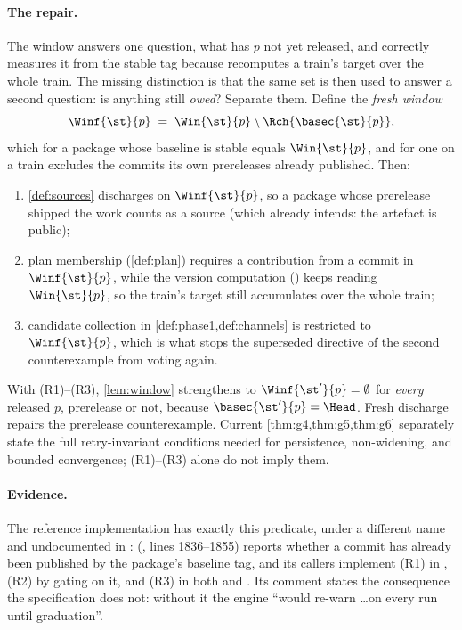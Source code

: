 \paragraph{The repair.} The window answers one question, what has $p$ not
yet released, and  correctly measures it from the stable tag
because  recomputes a train's target over the whole train. The
missing distinction is that the same set is then used to answer a second
question: is anything still \emph{owed}? Separate them. Define the
\emph{fresh window}
\[
  \Winf{\st}{p} \;=\; \Win{\st}{p} \setminus \Rch{\basec{\st}{p}},
\]
which for a package whose baseline is stable equals $\Win{\st}{p}$, and for one
on a train excludes the commits its own prereleases already published. Then:
\begin{enumerate}[label=(R\arabic*),leftmargin=3.2em]
  \item \cref{def:sources} discharges on $\Winf{\st}{p}$, so a package whose
    prerelease shipped the work counts as a source (which  already
    intends: the artefact is public);
  \item plan membership (\cref{def:plan}) requires a contribution from a commit
    in $\Winf{\st}{p}$, while the version computation () keeps
    reading $\Win{\st}{p}$, so the train's target still accumulates over the
    whole train;
  \item candidate collection in \cref{def:phase1,def:channels} is restricted to
    $\Winf{\st}{p}$, which is what stops the superseded directive of the second
    counterexample from voting again.
\end{enumerate}
With (R1)--(R3), \cref{lem:window} strengthens to $\Winf{\st'}{p} = \emptyset$
for \emph{every} released $p$, prerelease or not, because $\basec{\st'}{p} =
\Head$. Fresh discharge repairs the prerelease counterexample. Current \cref{thm:g4,thm:g5,thm:g6} separately state the full retry-invariant conditions needed for persistence, non-widening, and bounded convergence; (R1)--(R3) alone do not imply them.

\paragraph{Evidence.} The reference implementation has exactly this predicate,
under a different name and undocumented in \SPEC{}:
 (,
lines 1836--1855) reports whether a commit has already been published by the
package's baseline tag, and its callers implement (R1) in
, (R2) by gating  on it, and (R3) in both
 and . Its comment states the
consequence the specification does not: without it the engine ``would re-warn
\dots on every run until graduation''.

